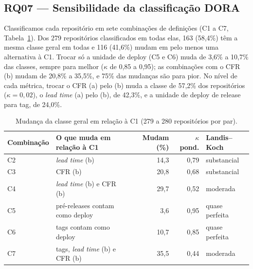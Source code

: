 \subsection{RQ07 --- Sensibilidade da classificação DORA}

Classificamos cada repositório em sete combinações de definições (C1 a C7, Tabela~\ref{tab:rq07}).
Dos 279 repositórios classificados em todas elas, 163 (58,4\%) têm a mesma classe geral em todas
e 116 (41,6\%) mudam em pelo menos uma alternativa à C1. Trocar só a unidade de deploy (C5 e C6)
muda de 3,6\% a 10,7\% das classes, sempre para melhor ($\kappa$ de 0,85 a 0,95); as
combinações com o CFR (b) mudam de 20,8\% a 35,5\%, e 75\% das mudanças são para pior. No nível
de cada métrica, trocar o CFR (a) pelo (b) muda a classe de 57,2\% dos repositórios
($\kappa = 0{,}02$), o \textit{lead time} (a) pelo (b), de 42,3\%, e a unidade de deploy de
release para tag, de 24,0\%.

\begin{table}[ht]
\centering
\small
\caption{Mudança da classe geral em relação à C1 (279 a 280 repositórios por par).}
\label{tab:rq07}
\begin{tabular}{llrrl}
\hline
Combinação & O que muda em relação à C1 & Mudam (\%) & $\kappa$ pond. & Landis--Koch \\
\hline
C2 & \textit{lead time} (b)                     & 14,3 & 0,79 & substancial \\
C3 & CFR (b)                                    & 20,8 & 0,68 & substancial \\
C4 & \textit{lead time} (b) e CFR (b)           & 29,7 & 0,52 & moderada \\
C5 & pré-releases contam como deploy            & 3,6  & 0,95 & quase perfeita \\
C6 & tags contam como deploy                    & 10,7 & 0,85 & quase perfeita \\
C7 & tags, \textit{lead time} (b) e CFR (b)     & 35,5 & 0,44 & moderada \\
\hline
\end{tabular}
\end{table}
